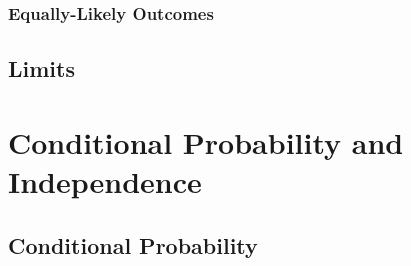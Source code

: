 \documentclass{article}
\begin{document}
\subsubsection{Equally-Likely Outcomes}

\subsection{Limits}

\newpage
\section{Conditional Probability and Independence}

\subsection{Conditional Probability}
\end{document}
